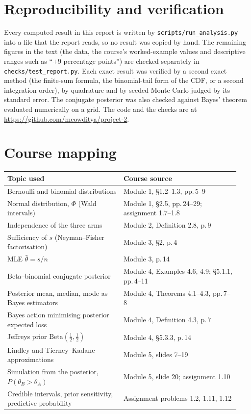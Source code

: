 \documentclass[11pt,a4paper]{article}
\newcommand{\Beta}{\mathrm{Beta}}
\newcommand{\tA}{\theta_A}
\newcommand{\tB}{\theta_B}
\newcommand{\repourl}{\url{https://github.com/meowditya/project-2}}
\begin{document}
\section{Reproducibility and verification}

Every computed result in this report is written by \texttt{scripts/run\_analysis.py} into a file
that the report reads, so no result was copied by hand. The remaining figures in the text (the data,
the course's worked-example values and descriptive ranges such as ``$\pm9$ percentage points'') are
checked separately in \texttt{checks/test\_report.py}. Each exact result was verified by a second exact method
(the finite-sum formula, the binomial-tail form of the CDF, or a second integration order), by
quadrature and by seeded Monte Carlo judged by its standard error. The conjugate posterior was also
checked against Bayes' theorem evaluated numerically on a grid. The code and the checks are at \repourl.

\appendix
\section{Course mapping}
\begin{table}[H]
\centering\small
\begin{tabular}{p{0.47\linewidth}p{0.47\linewidth}}
\toprule
Topic used & Course source\\
\midrule
Bernoulli and binomial distributions & Module 1, \S1.2--1.3, pp.\,5--9\\
Normal distribution, $\Phi$ (Wald intervals) & Module 1, \S2.5, pp.\,24--29; assignment 1.7--1.8\\
Independence of the three arms & Module 2, Definition 2.8, p.\,9\\
Sufficiency of $s$ (Neyman--Fisher factorisation) & Module 3, \S2, p.\,4\\
MLE $\hat\theta=s/n$ & Module 3, p.\,14\\
Beta--binomial conjugate posterior & Module 4, Examples 4.6, 4.9; \S5.1.1, pp.\,4--11\\
Posterior mean, median, mode as Bayes estimators & Module 4, Theorems 4.1--4.3, pp.\,7--8\\
Bayes action minimising posterior expected loss & Module 4, Definition 4.3, p.\,7\\
Jeffreys prior $\Beta(\tfrac12,\tfrac12)$ & Module 4, \S5.3.3, p.\,14\\
Lindley and Tierney--Kadane approximations & Module 5, slides 7--19\\
Simulation from the posterior, $P(\tB>\tA)$ & Module 5, slide 20; assignment 1.10\\
Credible intervals, prior sensitivity, predictive probability & Assignment problems 1.2, 1.11, 1.12\\
\bottomrule
\end{tabular}
\end{table}
\end{document}
